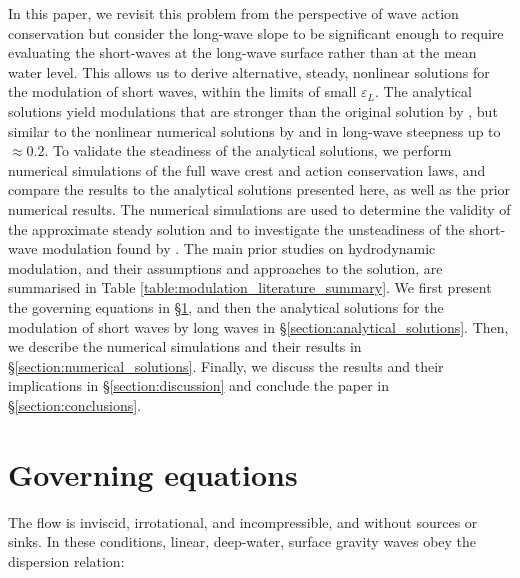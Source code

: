 \documentclass[lineno]{jfm}
\begin{document}
In this paper, we revisit this problem from the perspective of wave action
conservation but consider the long-wave slope to be significant enough to
require evaluating the short-waves at the long-wave surface rather than at the
mean water level.
This allows us to derive alternative, steady, nonlinear solutions for the
modulation of short waves, within the limits of small $\varepsilon_L$.
The analytical solutions yield modulations that are stronger than the original
solution by \citet{longuet1960changes}, but similar to the nonlinear numerical
solutions by \citet{longuet1987propagation} and \citet{zhang1990evolution} in
long-wave steepness up to $\approx 0.2$.
To validate the steadiness of the analytical solutions, we perform numerical
simulations of the full wave crest and action conservation laws, and compare
the results to the analytical solutions presented here, as well as the prior
numerical results.
The numerical simulations are used to determine the validity of the approximate
steady solution and to investigate the unsteadiness of the short-wave modulation
found by \citet{peureux2021unsteady}.
The main prior studies on hydrodynamic modulation, and their assumptions and
approaches to the solution, are summarised in Table
\ref{table:modulation_literature_summary}.
We first present the governing equations in \S\ref{section:governing_equations},
and then the analytical solutions for the modulation of short waves by long waves
in \S\ref{section:analytical_solutions}.
Then, we describe the numerical simulations and their results in
\S\ref{section:numerical_solutions}.
Finally, we discuss the results and their implications in
\S\ref{section:discussion} and conclude the paper in \S\ref{section:conclusions}.

\section{Governing equations}
\label{section:governing_equations}

The flow is inviscid, irrotational, and incompressible, and without sources or
sinks.
In these conditions, linear, deep-water, surface gravity waves obey the
dispersion relation:
\end{document}
